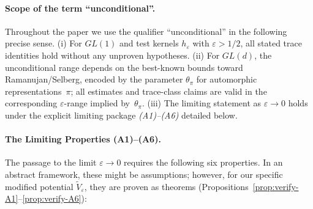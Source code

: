 ﻿\documentclass[12pt,a4paper]{article}
\theoremstyle{definition}
\theoremstyle{remark}
\begin{document}
\medskip
\paragraph{Scope of the term ``unconditional''.}
Throughout the paper we use the qualifier ``unconditional'' in the following precise sense.
(i) For $GL(1)$ and test kernels $h_\varepsilon$ with $\varepsilon>1/2$, all stated trace identities hold without any unproven hypotheses.
(ii) For $GL(d)$, the unconditional range depends on the best-known bounds toward Ramanujan/Selberg, encoded by the parameter $\theta_\pi$ for automorphic representations~$\pi$; all estimates and trace-class claims are valid in the corresponding $\varepsilon$-range implied by~$\theta_\pi$.
(iii) The limiting statement as $\varepsilon\to 0$ holds under the explicit limiting package \emph{(A1)--(A6)} detailed below.

\paragraph{The Limiting Properties (A1)--(A6).}
The passage to the limit $\varepsilon \to 0$ requires the following six properties. In an abstract framework, these might be assumptions; however, for our specific modified potential $\widetilde{V}_\varepsilon$, they are proven as theorems (Propositions~\ref{prop:verify-A1}--\ref{prop:verify-A6}):
\end{document}
